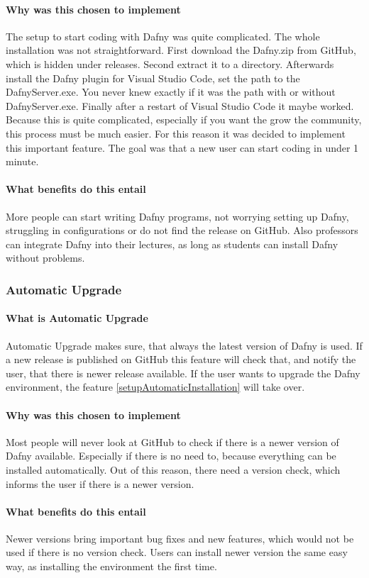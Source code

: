 \paragraph{Why was this chosen to implement}
The setup to start coding with Dafny was quite complicated. The whole installation was not straightforward. First download the Dafny.zip from GitHub, which is hidden under releases. Second extract it to a directory. Afterwards install the Dafny plugin for Visual Studio Code, set the path to the DafnyServer.exe. You never knew exactly if it was the path with or without DafnyServer.exe. Finally after a restart of Visual Studio Code it maybe worked. \newline
Because this is quite complicated, especially if you want the grow the community, this process must be much easier. For this reason it was decided to implement this important feature. The goal was that a new user can start coding in under 1 minute. 
\paragraph{What benefits do this entail}
More people can start writing Dafny programs, not worrying setting up Dafny, struggling in configurations or do not find the release on GitHub. Also professors can integrate Dafny into their lectures, as long as students can install Dafny without problems. 
\subsubsection{Automatic Upgrade} \label{setupAutomaticUpgrade}
\paragraph{What is Automatic Upgrade}
Automatic Upgrade makes sure, that always the latest version of Dafny is used. If a new release is published on GitHub this feature will check that, and notify the user, that there is newer release available. If the user wants to upgrade the Dafny environment, the feature \ref{setupAutomaticInstallation} will take over. 
\paragraph{Why was this chosen to implement}
Most people will never look at GitHub to check if there is a newer version of Dafny available. Especially if there is no need to, because everything can be installed automatically. Out of this reason, there need a version check, which informs the user if there is a newer version. 
\paragraph{What benefits do this entail}
Newer versions bring important bug fixes and new features, which would not be used if there is no version check. Users can install newer version the same easy way, as installing the environment the first time.  
